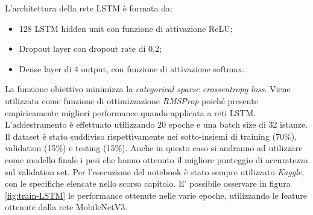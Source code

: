 \documentclass[11pt]{report}
\begin{document}
L'architettura della rete LSTM è formata da:
\begin{itemize}
    \item 128 LSTM hidden unit con funzione di attivazione ReLU;
    
    \item Dropout layer con dropout rate di 0.2;
    
    \item Dense layer di 4 output, con funzione di attivazione softmax.
    
\end{itemize}

La funzione obiettivo minimizza la \textit{categorical sparse crossentropy loss}. Viene utilizzata come funzione di ottimizzazione \textit{RMSProp} \cite{tieleman2012rmsprop} poiché presente empiricamente migliori performance quando applicata a reti LSTM. L'addestramento è effettuato utilizzando 20 epoche e una batch size di 32 istanze. Il dataset è stato suddiviso rispettivamente nei sotto-insiemi di training (70\%), validation (15\%) e testing (15\%). Anche in questo caso si andranno ad utilizzare come modello finale i pesi che hanno ottenuto il migliore punteggio di accuratezza sul validation set. Per l'esecuzione del notebook è stato sempre utilizzato \textit{Kaggle}, con le specifiche elencate nello scorso capitolo. E' possibile osservare in figura \ref{fig:train-LSTM} le performance ottenute nelle varie epoche, utilizzando le feature ottenute dalla rete MobileNetV3.
\end{document}
